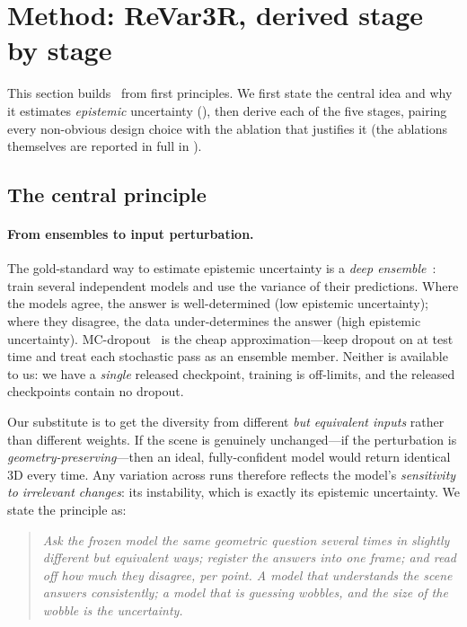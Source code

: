 \section{Method: ReVar3R, derived stage by stage}
\label{sec:method}

This section builds \trustr\ from first principles. We first state the central idea and why it
estimates \emph{epistemic} uncertainty (), then derive each of the five stages,
pairing every non-obvious design choice with the ablation that justifies it (the ablations
themselves are reported in full in ).

\subsection{The central principle}
\label{sec:method-idea}

\paragraph{From ensembles to input perturbation.} The gold-standard way to estimate epistemic
uncertainty is a \emph{deep ensemble}~\cite{ensembles}: train several independent models and use the
variance of their predictions. Where the models agree, the answer is well-determined (low epistemic
uncertainty); where they disagree, the data under-determines the answer (high epistemic uncertainty).
MC-dropout~\cite{mcdropout} is the cheap approximation---keep dropout on at test time and treat each
stochastic pass as an ensemble member. Neither is available to us: we have a \emph{single} released
checkpoint, training is off-limits, and the released checkpoints contain no dropout.

Our substitute is to get the diversity from different \emph{but equivalent inputs} rather than
different weights. If the scene is genuinely unchanged---if the perturbation is
\emph{geometry-preserving}---then an ideal, fully-confident model would return identical 3D every
time. Any variation across runs therefore reflects the model's \emph{sensitivity to irrelevant
changes}: its instability, which is exactly its epistemic uncertainty. We state the principle as:

\begin{quote}
\emph{Ask the frozen model the same geometric question several times in slightly different but
equivalent ways; register the answers into one frame; and read off how much they disagree, per point.
A model that understands the scene answers consistently; a model that is guessing wobbles, and the
size of the wobble is the uncertainty.}
\end{quote}

